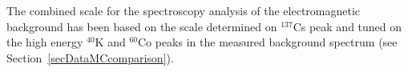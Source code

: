 The combined scale for the spectroscopy analysis of the electromagnetic background has been based on the scale determined on $^{137}$Cs peak and tuned on the high energy $^{40}$K and $^{60}$Co peaks in the measured background spectrum (see Section~\ref{secDataMCcomparison}).







